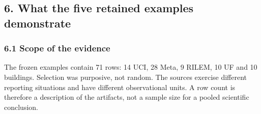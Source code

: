 \documentclass[
  american,
  11pt,
  letterpaper,
]{article}
\begin{document}
\subsection{6. What the five retained examples
demonstrate}\label{what-the-five-retained-examples-demonstrate}

\subsubsection{6.1 Scope of the evidence}\label{scope-of-the-evidence}

The frozen examples contain 71 rows: 14 UCI, 28 Meta, 9 RILEM, 10 UF and
10 buildings. Selection was purposive, not random. The sources exercise
different reporting situations and have different observational units. A
row count is therefore a description of the artifacts, not a sample size
for a pooled scientific conclusion.
\end{document}

